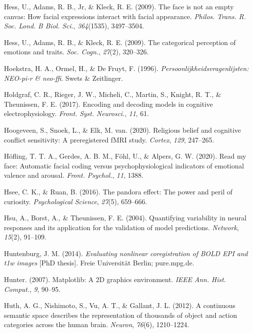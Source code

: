 \documentclass[11pt,american,a4paper,oneside,]{memoir} %
\begin{document}
\leavevmode\hypertarget{ref-Hess2009-xo}{}%
Hess, U., Adams, R. B., Jr, \& Kleck, R. E. (2009). The face is not an empty canvas: How facial expressions interact with facial appearance. \emph{Philos. Trans. R. Soc. Lond. B Biol. Sci.}, \emph{364}(1535), 3497--3504.

\leavevmode\hypertarget{ref-Hess2009-br}{}%
Hess, U., Adams, R. B., \& Kleck, R. E. (2009). The categorical perception of emotions and traits. \emph{Soc. Cogn.}, \emph{27}(2), 320--326.

\leavevmode\hypertarget{ref-Hoekstra1996-kv}{}%
Hoekstra, H. A., Ormel, H., \& De Fruyt, F. (1996). \emph{Persoonlijkheidsvragenlijsten: NEO-pi-r \& neo-ffi}. Swets \& Zeitlinger.

\leavevmode\hypertarget{ref-Holdgraf2017-eu}{}%
Holdgraf, C. R., Rieger, J. W., Micheli, C., Martin, S., Knight, R. T., \& Theunissen, F. E. (2017). Encoding and decoding models in cognitive electrophysiology. \emph{Front. Syst. Neurosci.}, \emph{11}, 61.

\leavevmode\hypertarget{ref-Hoogeveen2020-qp}{}%
Hoogeveen, S., Snoek, L., \& Elk, M. van. (2020). Religious belief and cognitive conflict sensitivity: A preregistered fMRI study. \emph{Cortex}, \emph{129}, 247--265.

\leavevmode\hypertarget{ref-Hofling2020-mk}{}%
Höfling, T. T. A., Gerdes, A. B. M., Föhl, U., \& Alpers, G. W. (2020). Read my face: Automatic facial coding versus psychophysiological indicators of emotional valence and arousal. \emph{Front. Psychol.}, \emph{11}, 1388.

\leavevmode\hypertarget{ref-hsee2016pandora}{}%
Hsee, C. K., \& Ruan, B. (2016). The pandora effect: The power and peril of curiosity. \emph{Psychological Science}, \emph{27}(5), 659--666.

\leavevmode\hypertarget{ref-Hsu2004-hs}{}%
Hsu, A., Borst, A., \& Theunissen, F. E. (2004). Quantifying variability in neural responses and its application for the validation of model predictions. \emph{Network}, \emph{15}(2), 91--109.

\leavevmode\hypertarget{ref-Huntenburg2014-ps}{}%
Huntenburg, J. M. (2014). \emph{Evaluating nonlinear coregistration of BOLD EPI and t1w images} {[}PhD thesis{]}. Freie Universität Berlin; pure.mpg.de.

\leavevmode\hypertarget{ref-Hunter2007-at}{}%
Hunter. (2007). Matplotlib: A 2D graphics environment. \emph{IEEE Ann. Hist. Comput.}, \emph{9}, 90--95.

\leavevmode\hypertarget{ref-Huth2012-yc}{}%
Huth, A. G., Nishimoto, S., Vu, A. T., \& Gallant, J. L. (2012). A continuous semantic space describes the representation of thousands of object and action categories across the human brain. \emph{Neuron}, \emph{76}(6), 1210--1224.
\end{document}
